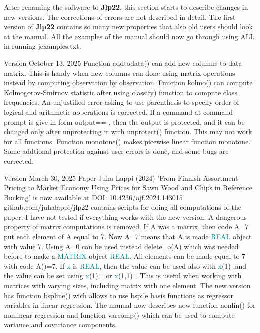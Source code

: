  
 
After renaming the software to \textbf{Jlp22}, this section starts to describe changes in new versions. 
The corrections of errors are not described in detail. The first version of \textbf{Jlp22} contains so many new properties that also old users 
should look at the manual. All the examples of the manual should now go through using ALL in running 
jexamples.txt. 
 
Version October 13, 2025 
Function addtodata() can add new columns to data matrix. This is handy when new columns can done using 
matrix operations instead by computing observation by observation. Function kolmo() can compute Kolmogorov-Smirnov statistic after 
using classify) function to compute class frequencies. An unjustified error asking to use parenthesis to specify 
order of logical and arithmetic aoperations is corrected. 
If a command at command prompt is give in form output==  , then the output is protected, 
and it can be changed only after unprotecting it with \textcolor{VioletRed}{unprotect}() function. 
This may not work for all functions. 
Function monotone() makes picewise linear function monotone. Some addtional protection against user errors is done, 
and some bugs are corrected. 
 
Version March 30, 2025   Paper Juha Lappi (2024) 'From Finnish Assortment Pricing to Market 
Economy Using Prices for Sawn Wood and 
Chips in Reference Bucking' is now available at DOI: 10.4236/ojf.2024.143015 
github.com/juhalappi/jlp22  contains scripts for doing all computations of the paper. I have not 
tested if everything works with the new version. 
A dangerous property of matrix computations is removed. If A was a matrix, then code A=7 put 
each element of A equal to 7. Now A=7 means that A is made \textcolor{teal}{REAL} object with value 7. Using 
A=0 can be used instead \textcolor{VioletRed}{delete\_o}(A) which was needed before to make a \textcolor{teal}{MATRIX} object \textcolor{teal}{REAL}. All 
elements can be made equal to 7 with code A()=7. If \textcolor{teal}{x} is \textcolor{teal}{REAL}, then the value can be used also with 
\textcolor{teal}{x}(1) ,and the value can be set using \textcolor{teal}{x}(1)= or \textcolor{teal}{x}(1,1)=.This is useful when working with matrices 
with varying sizes, including matrix with one element. The new version has function bspline() wich allows 
to use bspile basis functions as regressor variables in linear regression. The manual now describes 
now function \textcolor{VioletRed}{nonlin}() for nonlinear regression and function \textcolor{VioletRed}{varcomp}() which can be used to 
compute variance and covariance components. 
 

